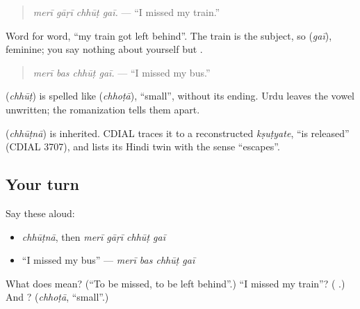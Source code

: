\begin{quote}
\emph{merī gāṛī chhūṭ gaī.} — \textquotedblleft{}I missed my train.\textquotedblright{}
\end{quote}

Word for word, \textquotedblleft{}my train got left behind\textquotedblright{}. The train is the subject, so \textbf{} (\emph{gaī}), feminine; you say nothing about yourself but \textbf{}.

\begin{quote}
\textbf{   }
\end{quote}

\begin{quote}
\emph{merī bas chhūṭ gaī.} — \textquotedblleft{}I missed my bus.\textquotedblright{}
\end{quote}

\textbf{} (\emph{chhūṭ}) is spelled like \textbf{} (\emph{chhoṭā}), \textquotedblleft{}small\textquotedblright{}, without its ending. Urdu leaves the vowel unwritten; the romanization tells them apart.

\begin{cousinweb}
\textbf{} (\emph{chhūṭnā}) is inherited. CDIAL traces it to a reconstructed \emph{kṣuṭyate}, \textquotedblleft{}is released\textquotedblright{} (CDIAL 3707), and lists its Hindi twin with the sense \textquotedblleft{}escapes\textquotedblright{}.
\end{cousinweb}

\subsection*{Your turn}
Say these aloud:

\begin{itemize}
\raggedright
  \item \emph{chhūṭnā}, then \emph{merī gāṛī chhūṭ gaī}
  \item \textquotedblleft{}I missed my bus\textquotedblright{} — \emph{merī bas chhūṭ gaī}
\end{itemize}

\begin{tcolorbox}[breakable,colback=teal!4,colframe=teal!35!black,title={Before you move on}]
What does \textbf{} mean? (\textquotedblleft{}To be missed, to be left behind\textquotedblright{}.) \textquotedblleft{}I missed my train\textquotedblright{}? (\textbf{   }.) And \textbf{}? (\emph{chhoṭā}, \textquotedblleft{}small\textquotedblright{}.)
\end{tcolorbox}
